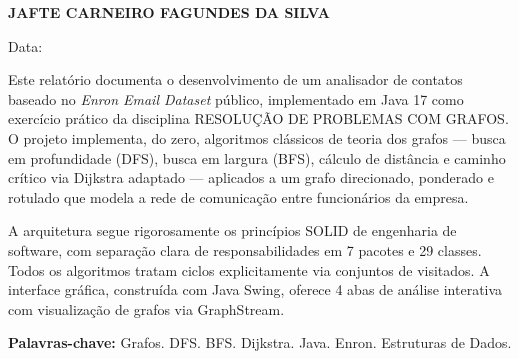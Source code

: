 \documentclass[12pt,openright,twoside,a4paper,english,brazilian,hidelinks]{abntex2}
\newcommand{\autorNome}{JAFTE CARNEIRO FAGUNDES DA SILVA}
\newcommand{\disciplina}{RESOLUÇÃO DE PROBLEMAS COM GRAFOS}
\begin{document}

    \frenchspacing

    \imprimircapa

    \begin{folhaderosto}
        \begin{center}
            \textbf{\autorNome} \\
        \end{center}

        \vspace*{3cm}

        \begin{center}
            \textbf{\imprimirtitulo}
        \end{center}

        \vspace*{3cm}

        \begin{flushleft}
            \preambulo{}
        \end{flushleft}

        \vspace*{\fill}

        \begin{center}
            Data: \imprimirdata
        \end{center}
    \end{folhaderosto}

    \tableofcontents*
    \cleardoublepage


    \begin{resumo}
        Este relatório documenta o desenvolvimento de um analisador de contatos baseado no
        \textit{Enron Email Dataset} público, implementado em Java 17 como exercício prático
        da disciplina \disciplina{}. O projeto implementa, do zero, algoritmos clássicos de
        teoria dos grafos --- busca em profundidade (DFS), busca em largura (BFS), cálculo de
        distância e caminho crítico via Dijkstra adaptado --- aplicados a um grafo direcionado,
        ponderado e rotulado que modela a rede de comunicação entre funcionários da empresa.

        A arquitetura segue rigorosamente os princípios SOLID de engenharia de software,
        com separação clara de responsabilidades em 7 pacotes e 29 classes. Todos os algoritmos
        tratam ciclos explicitamente via conjuntos de visitados. A interface gráfica, construída
        com Java Swing, oferece 4 abas de análise interativa com visualização de grafos via
        GraphStream.

        \textbf{Palavras-chave:} Grafos. DFS. BFS. Dijkstra. Java. Enron. Estruturas de Dados.
    \end{resumo}
\end{document}
